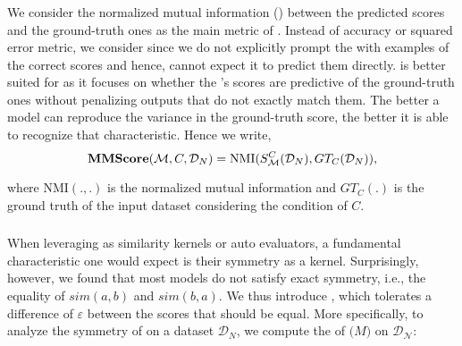\subsubsection{\nmi{}}
We consider the normalized mutual information (\nmi{}) between the predicted scores and the ground-truth ones as the main metric of \mmscore{}. Instead of accuracy or squared error metric, we consider \nmi{} since we do not explicitly prompt the \model{} with examples of the correct scores and hence, cannot expect it to predict them directly. 
\nmi{} is better suited for \mmscore{} as it focuses on whether the \model{}'s scores are predictive of the ground-truth ones without penalizing outputs that do not exactly match them. 
The better a model can reproduce the variance in the ground-truth score, the better it is able to recognize that characteristic. Hence we write,
\[
\textbf{MMScore}(\mathcal{M}, C, \mathcal{D}_N) = \text{NMI}(S_{\mathcal{M}}^{C}(\mathcal{D}_N), GT_C(\mathcal{D}_N)),
\]

where $\text{NMI}(.,.)$ is the normalized mutual information and $GT_C(.)$ is the ground truth of the input dataset considering the condition of $C$.



\vspace{-1mm}
\subsubsection{\relaxsym{}}

When leveraging \modelss{} as similarity kernels or auto evaluators, a fundamental characteristic one would expect is their symmetry as a kernel.  Surprisingly, however, we found that most models do not satisfy exact symmetry, i.e., the equality of $sim(a, b)$ and $sim(b, a)$. We thus introduce \relaxsym, which tolerates a difference of $\varepsilon$ between the scores that should be equal. More specifically, to analyze the symmetry of \modelss{} on a dataset $\mathcal{D}_N$, we compute the \relaxsym{} of $\mathcal(M)$ on $\mathcal{D_N}$:


